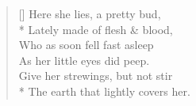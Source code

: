 \documentclass[MAIN]{subfiles}
\begin{document}
\settowidth{\versewidth}{Here lies, to each her parents' ruth,}
\begin{verse}[\versewidth]
Here she lies, a pretty bud,\\*
Lately made of flesh \& blood,\\
Who as soon fell fast asleep\\
As her little eyes did peep.\\
Give her strewings, but not stir\\*
The earth that lightly covers her.
\end{verse}
\end{document}
